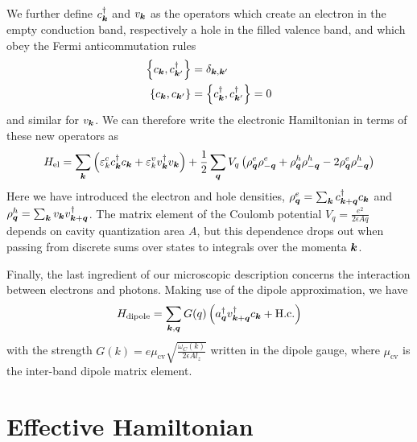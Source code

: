 We further define $c_{\bm{k}}^{\dagger}$ and $v_{\bm{k}}$ as the operators which
create an electron in the empty conduction band, respectively a hole
in the filled valence band, and which obey the Fermi anticommutation
rules
\begin{align}
  \left\{c_{\bm{k}}, c_{\bm{k}^{\prime}}^{\dagger}\right\} & =\delta_{\bm{k},\bm{k}^{\prime}}\\
  \left\{c_{\bm{k}}, c_{\bm{k}^{\prime}}\right\} & = \left\{c_{\bm{k}}^{\dagger}, c_{\bm{k}^{\prime}}^{\dagger}\right\} = 0
\end{align}
and similar for $v_{\bm{k}}$. We can therefore write the electronic
Hamiltonian in terms of these new operators as~\cite{Keeling_2007}
%
\begin{equation}\label{eq:coulomb-hamiltonian}
  H_{\text{el}} = \sum_{\bm{k}} \left( \varepsilon^c_k c_{\bm{k}}^{\dagger} c_{\bm{k}} + \varepsilon^v_k v_{\bm{k}}^{\dagger} v_{\bm{k}} \right) + \frac{1}{2}\sum_{\bm{q}} V_q \left( \rho^e_{\bm{q}} \rho^e_{-\bm{q}} + \rho^h_{\bm{q}} \rho^h_{-\bm{q}} -2 \rho^e_{\bm{q}} \rho^h_{-\bm{q}}\right)
\end{equation}
% 
Here we have introduced the electron and hole densities,
$\rho^e_{\bm{q}} = \sum_{\bm{k}} c_{\bm{k} + \bm{q}}^{\dagger} c_{\bm{k}}$ and
$\rho^h_{\bm{q}} = \sum_{\bm{k}} v_{\bm{k}} v_{\bm{k} + \bm{q}}^{\dagger}$. The
matrix element of the Coulomb potential
$V_q = \frac{e^2}{2 \epsilon A q}$ depends on cavity quantization area
$A$, but this dependence drops out when passing from discrete sums
over states to integrals over the momenta $\bm{k}$.

Finally, the last ingredient of our microscopic description concerns
the interaction between electrons and photons. Making use of the
dipole approximation, we have
%
\begin{equation}\label{eq:dipolar-inter}
  H_{\text{dipole}} = \sum_{\bm{k}, \bm{q}} G(q) \left( a_{\bm{q}}^{\dagger} v_{\bm{k} + \bm{q}}^{\dagger} c_{\bm{k}} + \text{H.c.}\right)
\end{equation}
% 
with the strength
$G(k) = e \mu_{\text{cv}}\sqrt{\frac{\omega_C(k)}{2\epsilon A l_z}}$
written in the dipole gauge, where $\mu_{\text{cv}}$ is the inter-band
dipole matrix element.


\section{Effective Hamiltonian}
\label{sec:effective}


